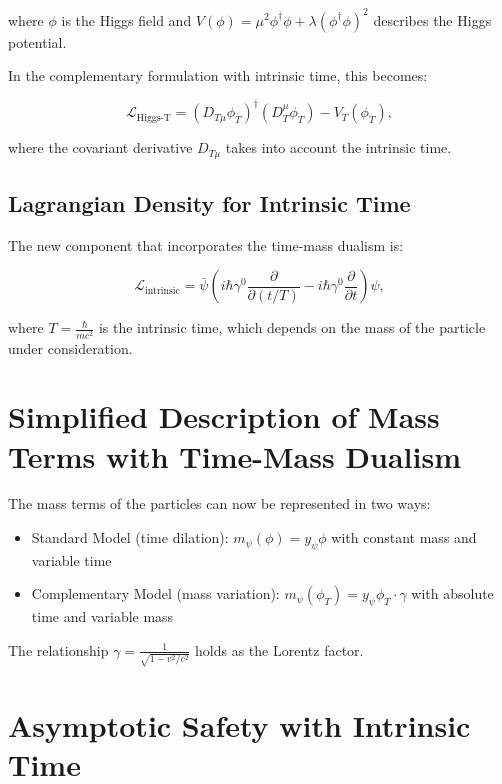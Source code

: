 \documentclass{article}
\begin{document}
	where $\phi$ is the Higgs field and $V(\phi) = \mu^2 \phi^\dagger \phi + \lambda (\phi^\dagger \phi)^2$ describes the Higgs potential.
	
	In the complementary formulation with intrinsic time, this becomes:
	
	\begin{equation}
		\mathcal{L}_\text{Higgs-T} = (D_{T\mu} \phi_T)^\dagger (D_T^\mu \phi_T) - V_T(\phi_T),
	\end{equation}
	
	where the covariant derivative $D_{T\mu}$ takes into account the intrinsic time.
	
	\subsection{Lagrangian Density for Intrinsic Time}
	The new component that incorporates the time-mass dualism is:
	
	\begin{equation}
		\mathcal{L}_\text{intrinsic} = \bar{\psi}\left(i\hbar\gamma^0 \frac{\partial}{\partial (t/T)} - i\hbar\gamma^0 \frac{\partial}{\partial t}\right)\psi,
	\end{equation}
	
	where $T = \frac{\hbar}{mc^2}$ is the intrinsic time, which depends on the mass of the particle under consideration.
	
	\section{Simplified Description of Mass Terms with Time-Mass Dualism}
	
	The mass terms of the particles can now be represented in two ways:
	
	\begin{itemize}
		\item Standard Model (time dilation): $m_\psi(\phi) = y_\psi \phi$ with constant mass and variable time
		\item Complementary Model (mass variation): $m_\psi(\phi_T) = y_\psi \phi_T \cdot \gamma$ with absolute time and variable mass
	\end{itemize}
	
	The relationship $\gamma = \frac{1}{\sqrt{1-v^2/c^2}}$ holds as the Lorentz factor.
	
	\section{Asymptotic Safety with Intrinsic Time}
	
\end{document}
